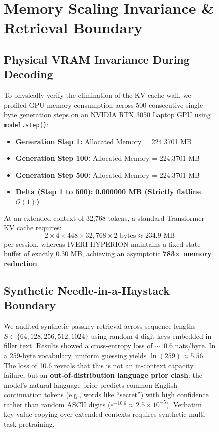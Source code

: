 \documentclass[10pt,twocolumn,letterpaper]{article}
\begin{document}
\begin{figure}[t]
\section{Memory Scaling Invariance \& Retrieval Boundary}
\label{sec:memory}

\subsection{Physical VRAM Invariance During Decoding}
To physically verify the elimination of the KV-cache wall, we profiled GPU memory consumption across 500 consecutive single-byte generation steps on an NVIDIA RTX 3050 Laptop GPU using \texttt{model.step()}:
\begin{itemize}[leftmargin=*]
    \item \textbf{Generation Step 1:} Allocated Memory = 224.3701 MB
    \item \textbf{Generation Step 100:} Allocated Memory = 224.3701 MB
    \item \textbf{Generation Step 500:} Allocated Memory = 224.3701 MB
    \item \textbf{Delta (Step 1 to 500):} \textbf{0.000000 MB (Strictly flatline $\mathcal{O}(1)$)}
\end{itemize}

At an extended context of 32,768 tokens, a standard Transformer KV cache requires:
\begin{equation}
    2 \times 4 \times 448 \times 32,768 \times 2\text{ bytes} \approx 234.9\text{ MB}
\end{equation}
per session, whereas IVERI-HYPERION maintains a fixed state buffer of exactly 0.30 MB, achieving an asymptotic \textbf{783$\times$ memory reduction}.

\subsection{Synthetic Needle-in-a-Haystack Boundary}
We audited synthetic passkey retrieval across sequence lengths $S \in \{64, 128, 256, 512, 1024\}$ using random 4-digit keys embedded in filler text. Results showed a cross-entropy loss of $\sim 10.6$ nats/byte. In a 259-byte vocabulary, uniform guessing yields $\ln(259) \approx 5.56$. The loss of 10.6 reveals that this is not an in-context capacity failure, but an \textbf{out-of-distribution language prior clash}: the model's natural language prior predicts common English continuation tokens (e.g., words like ``secret'') with high confidence rather than random ASCII digits ($e^{-10.6} \approx 2.5 \times 10^{-5}$). Verbatim key-value copying over extended contexts requires synthetic multi-task pretraining.


\end{figure}
\end{document}
